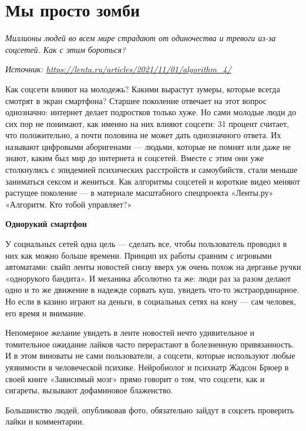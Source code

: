 
\section{Мы просто зомби}

\textit{Миллионы людей во всем мире страдают от одиночества и тревоги из-за соцсетей. Как с этим бороться?}

\textit{Источник: \url{https://lenta.ru/articles/2021/11/01/algorithm_4/}}

Как соцсети влияют на молодежь? Какими вырастут зумеры, которые всегда смотрят в экран смартфона? Старшее поколение отвечает на этот вопрос однозначно: интернет делает подростков только хуже. Но сами молодые люди до сих пор не понимают, как именно на них влияют соцсети: 31 процент считает, что положительно, а почти половина не может дать однозначного ответа. Их называют цифровыми аборигенами — людьми, которые не помнят или даже не знают, каким был мир до интернета и соцсетей. Вместе с этим они уже столкнулись с эпидемией психических расстройств и самоубийств, стали меньше заниматься сексом и жениться. Как алгоритмы соцсетей и короткие видео меняют растущее поколение — в материале масштабного спецпроекта «Ленты.ру» «Алгоритм. Кто тобой управляет?»

\textbf{Однорукий смартфон}

У социальных сетей одна цель --- сделать все, чтобы пользователь проводил в них как можно больше времени. Принцип их работы сравним с игровыми автоматами: свайп ленты новостей снизу вверх уж очень похож на дерганье ручки «однорукого бандита». И механика абсолютно та же: люди раз за разом делают одно и то же движение в надежде сорвать куш, увидеть что-то экстраординарное. Но если в казино играют на деньги, в социальных сетях на кону — сам человек, его время и внимание.

Непомерное желание увидеть в ленте новостей нечто удивительное и томительное ожидание лайков часто перерастают в болезненную привязанность. И в этом виноваты не сами пользователи, а соцсети, которые используют любые уязвимости в человеческой психике. Нейробиолог и психиатр Жадсон Брюер в своей книге «Зависимый мозг» прямо говорит о том, что соцсети, как и сигареты, вызывают дофаминовое блаженство.

\begin{fancyquotes}
    Большинство людей, опубликовав фото, обязательно зайдут в соцсеть проверить лайки и комментарии.
\end{fancyquotes}

